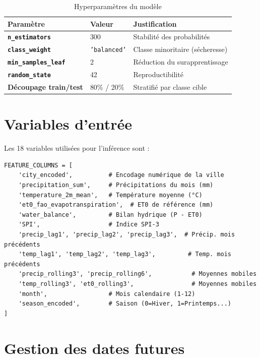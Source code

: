\documentclass[12pt,a4paper]{report}
\begin{document}
\begin{table}[H]
    \centering
    \begin{tabular}{>{\bfseries}p{4.5cm}p{4cm}p{5cm}}
        \toprule
        Paramètre & Valeur & Justification \\
        \midrule
        \texttt{n\_estimators} & 300 & Stabilité des probabilités \\
        \texttt{class\_weight} & \texttt{'balanced'} & Classe minoritaire (sécheresse) \\
        \texttt{min\_samples\_leaf} & 2 & Réduction du surapprentissage \\
        \texttt{random\_state} & 42 & Reproductibilité \\
        Découpage train/test & 80\% / 20\% & Stratifié par classe cible \\
        \bottomrule
    \end{tabular}
    \caption{Hyperparamètres du modèle}
\end{table}

\section{Variables d'entrée}

Les 18 variables utilisées pour l'inférence sont :

\begin{lstlisting}[style=pythonStyle, caption={Liste des 18 variables du modèle}]
FEATURE_COLUMNS = [
    'city_encoded',          # Encodage numérique de la ville
    'precipitation_sum',     # Précipitations du mois (mm)
    'temperature_2m_mean',   # Température moyenne (°C)
    'et0_fao_evapotranspiration',  # ET0 de référence (mm)
    'water_balance',         # Bilan hydrique (P - ET0)
    'SPI',                   # Indice SPI-3
    'precip_lag1', 'precip_lag2', 'precip_lag3',  # Précip. mois précédents
    'temp_lag1', 'temp_lag2', 'temp_lag3',         # Temp. mois précédents
    'precip_rolling3', 'precip_rolling6',           # Moyennes mobiles
    'temp_rolling3', 'et0_rolling3',                # Moyennes mobiles
    'month',                 # Mois calendaire (1-12)
    'season_encoded',        # Saison (0=Hiver, 1=Printemps...)
]
\end{lstlisting}

\section{Gestion des dates futures}
\end{document}
